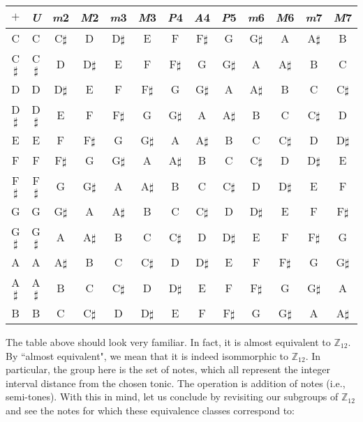 \documentclass[12pt, a4paper]{article}
\begin{document}
\begin{table}[htb]
\centering
    \begin{tabular}{c|cccccccccccc}
    
    $+$ & \textsl{U} & \textsl{m}2 & \textsl{M}2 & \textsl{m}3 & \textsl{M}3 & \textsl{P}4 & \textsl{A}4 & \textsl{P}5 & \textsl{m}6 & \textsl{M}6 & \textsl{m}7 & \textsl{M}7 \\
    
    \hline
    
    C & C & C$\sharp$ & D & D$\sharp$ & E & F & F$\sharp$ & G & G$\sharp$ & A & A$\sharp$ & B \\
    C$\sharp$ & C$\sharp$ & D & D$\sharp$ & E & F & F$\sharp$ & G & G$\sharp$ & A & A$\sharp$ & B & C \\
    D & D & D$\sharp$ & E & F & F$\sharp$ & G & G$\sharp$ & A & A$\sharp$ & B & C & C$\sharp$ \\
    D$\sharp$ & D$\sharp$ & E & F & F$\sharp$ & G & G$\sharp$ & A & A$\sharp$ & B & C & C$\sharp$ & D \\
    E & E & F & F$\sharp$ & G & G$\sharp$ & A & A$\sharp$ & B & C & C$\sharp$ & D & D$\sharp$ \\
    F & F & F$\sharp$ & G & G$\sharp$ & A & A$\sharp$ & B & C & C$\sharp$ & D & D$\sharp$ & E \\
    F$\sharp$ & F$\sharp$ & G & G$\sharp$ & A & A$\sharp$ & B & C & C$\sharp$ & D & D$\sharp$ & E & F \\
    G & G & G$\sharp$ & A & A$\sharp$ & B & C & C$\sharp$ & D & D$\sharp$ & E & F & F$\sharp$ \\
    G$\sharp$ & G$\sharp$ & A & A$\sharp$ & B & C & C$\sharp$ & D & D$\sharp$ & E & F & F$\sharp$ & G \\
    A & A & A$\sharp$ & B & C & C$\sharp$ & D & D$\sharp$ & E & F & F$\sharp$ & G & G$\sharp$ \\
    A$\sharp$ & A$\sharp$ & B & C & C$\sharp$ & D & D$\sharp$ & E & F & F$\sharp$ & G & G$\sharp$ & A \\
    B & B & C & C$\sharp$ & D & D$\sharp$ & E & F & F$\sharp$ & G & G$\sharp$ & A & A$\sharp$ \\

    \end{tabular}
\end{table}

\newpage

    The table above should look very familiar. In fact, it is almost equivalent to $\mathbb{Z}_{12}$. By ``almost equivalent", we mean that it is indeed isommorphic to $\mathbb{Z}_{12}$. In particular, the group here is the set of notes, which all represent the integer interval distance from the chosen tonic. The operation is addition of notes (i.e., semi-tones). With this in mind, let us conclude by revisiting our subgroups of $\mathbb{Z}_{12}$ and see the notes for which these equivalence classes correspond to:\par
    
\end{document}
